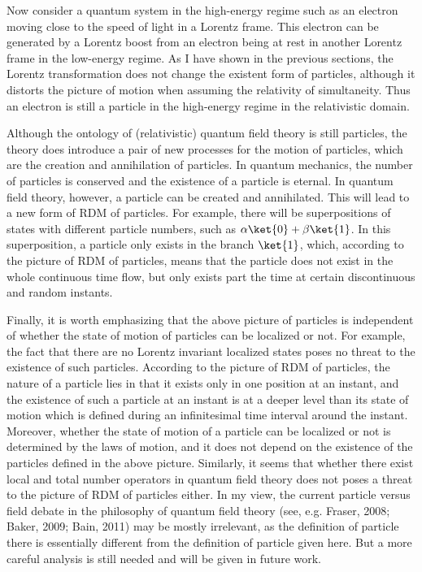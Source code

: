 Now consider a quantum system in the high-energy regime such as an electron moving close to the speed of light in a Lorentz frame.
This electron can be generated by a Lorentz boost from an electron being at rest in another Lorentz frame in the low-energy regime.
As I have shown in the previous sections, the Lorentz transformation does not change the existent form of particles, although it distorts the picture of motion when assuming the relativity of simultaneity. 
Thus an electron is still a particle in the high-energy regime in the relativistic domain.

Although the ontology of (relativistic) quantum field theory is still particles, the theory does introduce a pair of new processes for the motion of particles, which are the creation and annihilation of particles.
In quantum mechanics, the number of particles is conserved and the existence of a particle is eternal. 
In quantum field theory, however, a particle can be created and annihilated.
This will lead to a new form of RDM of particles.
For example, there will be superpositions of states with different particle numbers, such as $\alpha \ket{0} + \beta \ket{1}$. In this superposition, a particle only exists in the branch $\ket{1}$, which, according to the picture of RDM of particles, means that the particle does not exist in the whole continuous time flow, but only exists part the time at certain discontinuous and random instants.

Finally, it is worth emphasizing that the above picture of particles is independent of whether the state of motion of particles can be localized or not.
For example, the fact that there are no Lorentz invariant localized states poses no threat to the existence of such particles.
According to the picture of RDM of particles, the nature of a particle lies in that it exists only in one position at an instant, and the existence of such a particle at an instant is at a deeper level than its state of motion which is defined during an infinitesimal time interval around the instant.
Moreover, whether the state of motion of a particle can be localized or not is determined by the laws of motion,  and it does not depend on the existence of the particles defined in the above picture.
Similarly, it seems that whether there exist local and total number operators in quantum field theory does not poses a threat to the picture of RDM of particles either. In my view, the current particle versus field debate in the philosophy of quantum field theory (see, e.g. Fraser, 2008; Baker, 2009; Bain, 2011) may be mostly irrelevant, as the definition of particle there is essentially different from the definition of particle given here. But a more careful analysis is still needed and will be given in future work.

